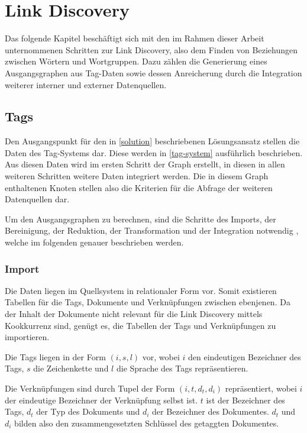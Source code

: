 \chapter{Link Discovery}

Das folgende Kapitel beschäftigt sich mit den im Rahmen dieser Arbeit unternommenen Schritten zur Link Discovery, also dem Finden von Beziehungen zwischen Wörtern und Wortgruppen. Dazu zählen die Generierung eines Ausgangsgraphen aus Tag-Daten sowie dessen Anreicherung durch die Integration weiterer interner und externer Datenquellen.

\section{Tags}

Den Ausgangspunkt für den in \ref{solution} beschriebenen Lösungsansatz stellen die Daten des Tag-Systems dar. Diese werden in \ref{tag-system} ausführlich beschrieben. Aus diesen Daten wird im ersten Schritt der Graph erstellt, in diesen in allen weiteren Schritten weitere Daten integriert werden. Die in diesem Graph enthaltenen Knoten stellen also die Kriterien für die Abfrage der weiteren Datenquellen dar.

Um den Ausgangsgraphen zu berechnen, sind die Schritte des Imports, der Bereinigung, der Reduktion, der Transformation und der Integration notwendig \cite{hkp2012}, welche im folgenden genauer beschrieben werden.

\subsection{Import}

Die Daten liegen im Quellsystem in relationaler Form vor. Somit existieren Tabellen für die Tags, Dokumente und Verknüpfungen zwischen ebenjenen. Da der Inhalt der Dokumente nicht relevant für die Link Discovery mittels Kookkurrenz sind, genügt es, die Tabellen der Tags und Verknüpfungen zu importieren.

Die Tags liegen in der Form \((i, s, l)\) vor, wobei \(i\) den eindeutigen Bezeichner des Tags, \(s\) die Zeichenkette und \(l\) die Sprache des Tags repräsentieren.

Die Verknüpfungen sind durch Tupel der Form \((i, t, d_t, d_i)\) repräsentiert, wobei \(i\) der eindeutige Bezeichner der Verknüpfung selbst ist. \(t\) ist der Bezeichner des Tags, \(d_t\) der Typ des Dokuments und \(d_i\) der Bezeichner des Dokumentes. \(d_t\) und \(d_i\) bilden also den zusammengesetzten Schlüssel des getaggten Dokumentes. 
 
